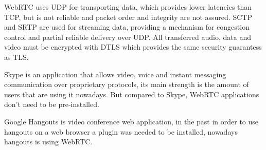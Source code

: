 \ac{WebRTC} uses \ac{UDP} for transporting data, which provides lower latencies than \ac{TCP}, but is not reliable and packet order and integrity are not assured. \ac{SCTP} and \ac{SRTP} are used for streaming data, providing a mechanism for congestion control and partial reliable delivery over \ac{UDP}. All transferred audio, data and video must be encrypted with \ac{DTLS} which provides the same security guarantess as \ac{TLS}. 

Skype is an application that allows video, voice and instant messaging communication over proprietary protocols, its main strength is the amount of users that are using it nowadays. But compared to Skype, \ac{WebRTC} applications don't need to be pre-installed.

Google Hangouts is video conference web application, in the past in order to use hangouts on a web browser a plugin was needed to be installed, nowadays hangouts is using \ac{WebRTC}.
